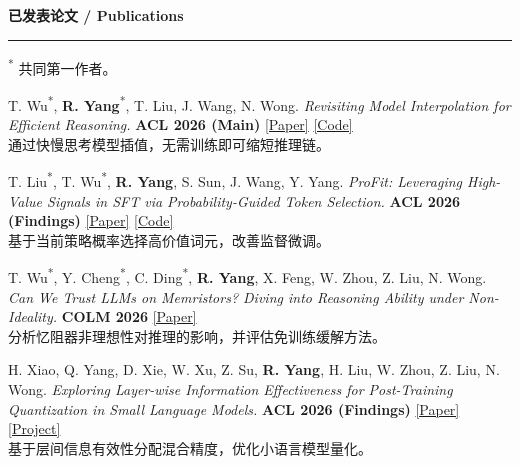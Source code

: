 \documentclass[UTF8,fontset=fandol,11pt,a4paper]{ctexart}
\newcommand{\venuebadge}[1]{\begingroup\setlength{\fboxsep}{1.5pt}\colorbox{venuefill}{\textcolor{venuetext}{\bfseries #1}}\endgroup}
\newenvironment{rSection}[1]{
  \Needspace{7\baselineskip}\medskip
  \textbf{#1}\smallskip\hrule\smallskip
}{\par}
\begin{document}
\begin{rSection}{已发表论文 / Publications}\linespread{1.05}\fontsize{10}{12}\selectfont\raggedright
\textsuperscript{*} 共同第一作者。
\begin{enumerate}[label={[\arabic*]}]
\item\begin{samepage} T. Wu\textsuperscript{*}, \textbf{R. Yang}\textsuperscript{*}, T. Liu, J. Wang, N. Wong. \textit{Revisiting Model Interpolation for Efficient Reasoning.} \venuebadge{ACL 2026 (Main)} \href{https://aclanthology.org/2026.acl-long.389/}{[Paper]} \href{https://github.com/wutaiqiang/MI}{[Code]}\\[1pt]{\textcolor{summarytext}{通过快慢思考模型插值，无需训练即可缩短推理链。}}\par\end{samepage}
\item\begin{samepage} T. Liu\textsuperscript{*}, T. Wu\textsuperscript{*}, \textbf{R. Yang}, S. Sun, J. Wang, Y. Yang. \textit{ProFit: Leveraging High-Value Signals in SFT via Probability-Guided Token Selection.} \venuebadge{ACL 2026 (Findings)} \href{https://aclanthology.org/2026.findings-acl.755/}{[Paper]} \href{https://github.com/Utaotao/ProFit}{[Code]}\\[1pt]{\textcolor{summarytext}{基于当前策略概率选择高价值词元，改善监督微调。}}\par\end{samepage}
\item\begin{samepage} T. Wu\textsuperscript{*}, Y. Cheng\textsuperscript{*}, C. Ding\textsuperscript{*}, \textbf{R. Yang}, X. Feng, W. Zhou, Z. Liu, N. Wong. \textit{Can We Trust LLMs on Memristors? Diving into Reasoning Ability under Non-Ideality.} \venuebadge{COLM 2026} \href{https://arxiv.org/abs/2603.13725}{[Paper]}\\[1pt]{\textcolor{summarytext}{分析忆阻器非理想性对推理的影响，并评估免训练缓解方法。}}\par\end{samepage}
\item\begin{samepage} H. Xiao, Q. Yang, D. Xie, W. Xu, Z. Su, \textbf{R. Yang}, H. Liu, W. Zhou, Z. Liu, N. Wong. \textit{Exploring Layer-wise Information Effectiveness for Post-Training Quantization in Small Language Models.} \venuebadge{ACL 2026 (Findings)} \href{https://aclanthology.org/2026.findings-acl.771/}{[Paper]} \href{https://github.com/HeXiao-55/LieQ-official}{[Project]}\\[1pt]{\textcolor{summarytext}{基于层间信息有效性分配混合精度，优化小语言模型量化。}}\par\end{samepage}

\end{enumerate}
\end{rSection}
\end{document}
